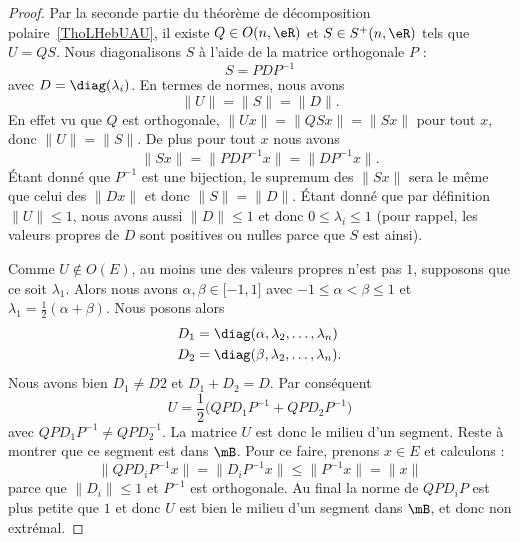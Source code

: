 \begin{proof}
	Par la seconde partie du théorème de décomposition polaire~\ref{ThoLHebUAU}, il existe \( Q\in O(n,\eR)\) et \( S\in S^+(n,\eR)\) tels que \( U=QS\). Nous diagonalisons \( S\) à l'aide de la matrice orthogonale \( P\) :
	\begin{equation}
		S=PDP^{-1}
	\end{equation}
	avec \( D=\diag(\lambda_i)\). En termes de normes, nous avons
	\begin{equation}
		\| U \|=\| S \|=\| D \|.
	\end{equation}
	En effet vu que \( Q\) est orthogonale, \( \| Ux \|=\| QSx \|=\| Sx \|\) pour tout \( x\), donc \( \| U \|=\| S \|\). De plus pour tout \( x\) nous avons
	\begin{equation}
		\| Sx \|=\| PDP^{-1} x \|=\| DP^{-1}x \|.
	\end{equation}
	Étant donné que \( P^{-1}\) est une bijection, le supremum des \( \| Sx \|\) sera le même que celui des \( \| Dx \|\) et donc \( \| S \|=\| D \|\). Étant donné que par définition \( \| U \|\leq 1\), nous avons aussi \( \| D \|\leq 1\) et donc \( 0\leq\lambda_i\leq 1\) (pour rappel, les valeurs propres de \( D\) sont positives ou nulles parce que \( S\) est ainsi).

	Comme \( U\notin O(E)\), au moins une des valeurs propres n'est pas \( 1\), supposons que ce soit \( \lambda_1\). Alors nous avons \( \alpha,\beta\in\mathopen[ -1 , 1 \mathclose]\) avec \( -1\leq \alpha<\beta\leq 1\) et \( \lambda_1=\frac{ 1 }{2}(\alpha+\beta)\). Nous posons alors
	\begin{subequations}
		\begin{align}
			D_1 & =\diag(\alpha,\lambda_2,\ldots, \lambda_n) \\
			D_2 & =\diag(\beta,\lambda_2,\ldots, \lambda_n).
		\end{align}
	\end{subequations}
	Nous avons bien \( D_1\neq D2\) et \( D_1+ D_2=D\). Par conséquent
	\begin{equation}
		U=\frac{ 1 }{2}\big( QPD_1P^{-1}+QPD_2P^{-1} \big)
	\end{equation}
	avec \( QPD_1P^{-1}\neq QPD_2^{-1}\). La matrice \( U \) est donc le milieu d'un segment. Reste à montrer que ce segment est dans \( \mB\). Pour ce faire, prenons \( x\in E\) et calculons :
	\begin{equation}
		\| QPD_iP^{-1}x \|=\| D_iP^{-1}x \|\leq\| P^{-1}x \|=\| x \|
	\end{equation}
	parce que \( \| D_i \|\leq 1\) et \( P^{-1}\) est orthogonale. Au final la norme de \( QPD_iP\) est plus petite que \( 1\) et donc \( U\) est bien le milieu d'un segment dans \( \mB\), et donc non extrémal.
\end{proof}

